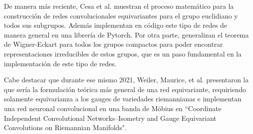 \documentclass[12pt,letterpaper,final, openany]{scrbook}
\begin{document}
De manera más reciente, Cesa et al. \cite{cesa_program_2021} muestran el proceso matemático para la construcción de redes convolucionales equivariantes para el grupo euclidiano y todos sus subgrupos. Además implementan en código este tipo de redes de manera general en una librería de Pytorch. Por otra parte, generalizan el teorema de Wigner-Eckart para todos los grupos compactos para poder encontrar representaciones irreducibles de estos grupos, que es un paso fundamental en la implementación de este tipo de redes.

Cabe destacar que durante ese mismo 2021, Weiler, Maurice, et al. \cite{weiler_coordinate_2021} presentaron la que sería la formulación teórica más general de una red equivariante, requiriendo solamente equivarianza a los gauges de variedades riemannianas e implementan una red neuronal convolucional en una banda de Möbius en ``Coordinate Independent Convolutional Networks--Isometry and Gauge Equivariant Convolutions on Riemannian Manifolds".
\end{document}
